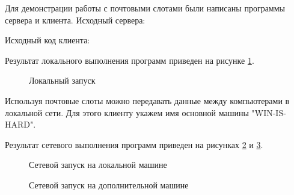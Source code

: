 \documentclass[a4paper]{article}
\begin{document}
	Для демонстрации работы с почтовыми слотами были написаны программы сервера и клиента.	Исходный сервера:
	
	
	Исходный код клиента:
	
	
	Результат локального выполнения программ приведен на рисунке \ref{img:task9}.
	\begin{figure}[h!]
		\caption{Локальный запуск}
		\label{img:task9}
	\end{figure}
	
	Используя почтовые слоты можно передавать данные между компьютерами в локальной сети. Для этого клиенту укажем имя основной машины "WIN-IS-HARD".
	
	Результат сетевого выполнения программ приведен на рисунках \ref{img:task9_net_local} и \ref{img:task9_net_remote}.
	\begin{figure}[h!]
		\caption{Сетевой запуск на локальной машине}
		\label{img:task9_net_local}
	\end{figure}

	\begin{figure}[h!]
		\caption{Сетевой запуск на дополнительной машине}
		\label{img:task9_net_remote}
	\end{figure}
	
\end{document}
